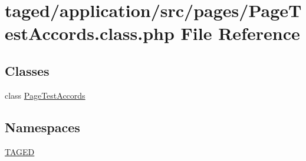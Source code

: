 \hypertarget{_page_test_accords_8class_8php}{}\section{taged/application/src/pages/\+Page\+Test\+Accords.class.\+php File Reference}
\label{_page_test_accords_8class_8php}
\subsection*{Classes}
\begin{DoxyCompactItemize}
\item 
class \hyperlink{class_page_test_accords}{Page\+Test\+Accords}
\end{DoxyCompactItemize}
\subsection*{Namespaces}
\begin{DoxyCompactItemize}
\item 
 \hyperlink{namespace_t_a_g_e_d}{T\+A\+G\+ED}
\end{DoxyCompactItemize}
